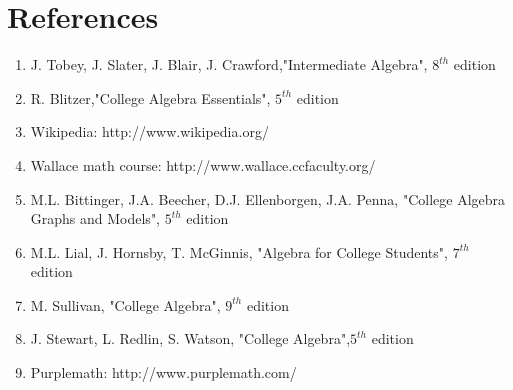\chapter{References}
%
\thispagestyle{empty}
%
\begin{enumerate}
	\item	J. Tobey, J. Slater, J. Blair, J. Crawford,"Intermediate Algebra", $8^{th}$ edition
	\item R. Blitzer,"College Algebra Essentials", $5^{th}$ edition
	\item Wikipedia: http://www.wikipedia.org/
	\item Wallace math course: http://www.wallace.ccfaculty.org/	
	\item M.L. Bittinger, J.A. Beecher, D.J. Ellenborgen, J.A. Penna, "College Algebra Graphs and Models", $5^{th}$ edition
	\item M.L. Lial, J. Hornsby, T. McGinnis, "Algebra for College Students", $7^{th}$ edition
	\item M. Sullivan, "College Algebra", $9^{th}$ edition
	\item J. Stewart, L. Redlin, S. Watson, "College Algebra",$5^{th}$ edition
	\item Purplemath: http://www.purplemath.com/
\end{enumerate}